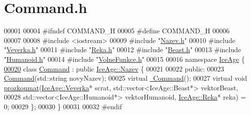 \hypertarget{Command_8h_source}{}\section{Command.\+h}
\label{Command_8h_source}

\begin{DoxyCode}
00001 
00004 \textcolor{preprocessor}{#ifndef COMMAND\_H}
00005 \textcolor{preprocessor}{#define COMMAND\_H}
00006 
00007 
00008 \textcolor{preprocessor}{#include <iostream>}
00009 \textcolor{preprocessor}{#include "\hyperlink{Nazev_8h}{Nazev.h}"}
00010 \textcolor{preprocessor}{#include "\hyperlink{Veverka_8h}{Veverka.h}"}
00011 \textcolor{preprocessor}{#include "\hyperlink{Reka_8h}{Reka.h}"}
00012 \textcolor{preprocessor}{#include "\hyperlink{Beast_8h}{Beast.h}"}
00013 \textcolor{preprocessor}{#include "\hyperlink{Humanoid_8h}{Humanoid.h}"}
00014 \textcolor{preprocessor}{#include "\hyperlink{VolneFunkce_8h}{VolneFunkce.h}"}
00015 
00016 \textcolor{keyword}{namespace }\hyperlink{namespaceIceAge}{IceAge} \{
\hypertarget{Command_8h_source.tex_l00020}{}\hyperlink{classIceAge_1_1Command}{00020}     \textcolor{keyword}{class }\hyperlink{classIceAge_1_1Command}{Command} : \textcolor{keyword}{public} \hyperlink{classIceAge_1_1Nazev}{IceAge::Nazev} \{
00021 
00022     \textcolor{keyword}{public}:
00023         \hyperlink{classIceAge_1_1Command_a451edb7cb24df79568a193929293041d}{Command}(std::string novyNazev);
00025         \textcolor{keyword}{virtual} \hyperlink{classIceAge_1_1Command_a604f37ab9196a5a59a5b6e61aa1efc35}{~Command}();
00027         \textcolor{keyword}{virtual} \textcolor{keywordtype}{void} \hyperlink{classIceAge_1_1Command_a0466e88c0c9e2a44618c12f6c88b76fe}{prozkoumat}(\hyperlink{classIceAge_1_1Veverka}{IceAge::Veverka}* scrat, 
      std::vector<IceAge::Beast*> vektorBeast,
00028                             std::vector<IceAge::Humanoid*> vektorHumanoid, 
      \hyperlink{classIceAge_1_1Reka}{IceAge::Reka}* reka) = 0;
00029     \};
00030 \}
00031 
00032 \textcolor{preprocessor}{#endif}
\end{DoxyCode}
